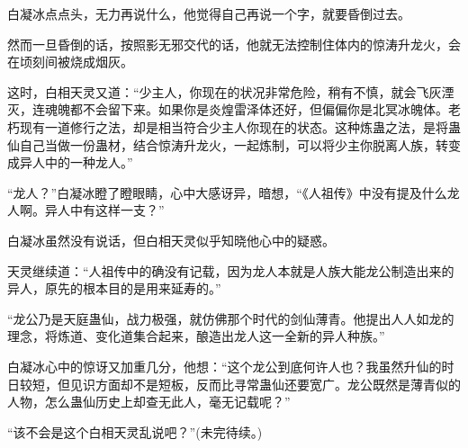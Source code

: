 \begin{this_body}
白凝冰点点头，无力再说什么，他觉得自己再说一个字，就要昏倒过去。

然而一旦昏倒的话，按照影无邪交代的话，他就无法控制住体内的惊涛升龙火，会在顷刻间被烧成烟灰。

这时，白相天灵又道：“少主人，你现在的状况非常危险，稍有不慎，就会飞灰湮灭，连魂魄都不会留下来。如果你是炎煌雷泽体还好，但偏偏你是北冥冰魄体。老朽现有一道修行之法，却是相当符合少主人你现在的状态。这种炼蛊之法，是将蛊仙自己当做一份蛊材，结合惊涛升龙火，一起炼制，可以将少主你脱离人族，转变成异人中的一种龙人。”

“龙人？”白凝冰瞪了瞪眼睛，心中大感讶异，暗想，“《人祖传》中没有提及什么龙人啊。异人中有这样一支？”

白凝冰虽然没有说话，但白相天灵似乎知晓他心中的疑惑。

天灵继续道：“人祖传中的确没有记载，因为龙人本就是人族大能龙公制造出来的异人，原先的根本目的是用来延寿的。”

“龙公乃是天庭蛊仙，战力极强，就仿佛那个时代的剑仙薄青。他提出人人如龙的理念，将炼道、变化道集合起来，酿造出龙人这一全新的异人种族。”

白凝冰心中的惊讶又加重几分，他想：“这个龙公到底何许人也？我虽然升仙的时日较短，但见识方面却不是短板，反而比寻常蛊仙还要宽广。龙公既然是薄青似的人物，怎么蛊仙历史上却查无此人，毫无记载呢？”

“该不会是这个白相天灵乱说吧？”(未完待续。)

\end{this_body}

